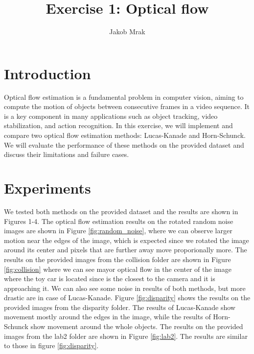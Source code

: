 \documentclass[9pt]{IEEEtran}
\title{\vspace{0ex}
Exercise 1: Optical flow}
\author{Jakob Mrak\vspace{-4.0ex}}
\begin{document}
\maketitle

\section{Introduction}

Optical flow estimation is a fundamental problem in computer vision, aiming to compute the motion of objects between consecutive frames in a video sequence. It is a key component in many applications such as object tracking, video stabilization, and action recognition. In this exercise, we will implement and compare two optical flow estimation methods: Lucas-Kanade and Horn-Schunck. We will evaluate the performance of these methods on the provided dataset and discuss their limitations and failure cases.

\section{Experiments}

We tested both methods on the provided dataset and the results are shown in Figures 1-4.
The optical flow estimation results on the rotated random noise images are shown in Figure \ref{fig:random_noise}, where we can observe larger motion near the edges of the image, which is expected since we rotated the image around its center and pixels that are further away move proporionally more.
The results on the provided images from the collision folder are shown in Figure \ref{fig:collision} where we can see mayor optical flow in the center of the image where the toy car is located since is the closest to the camera and it is approaching it. We can also see some noise in results of both methods, but more drastic are in case of Lucas-Kanade. 
Figure \ref{fig:disparity} shows the results on the provided images from the disparity folder. The results of Lucas-Kanade show movement mostly around the edges in the image, while the results of Horn-Schunck show movement around the whole objects.
The results on the provided images from the lab2 folder are shown in Figure \ref{fig:lab2}. The results are similar to those in figure \ref{fig:disparity}.
\end{document}
